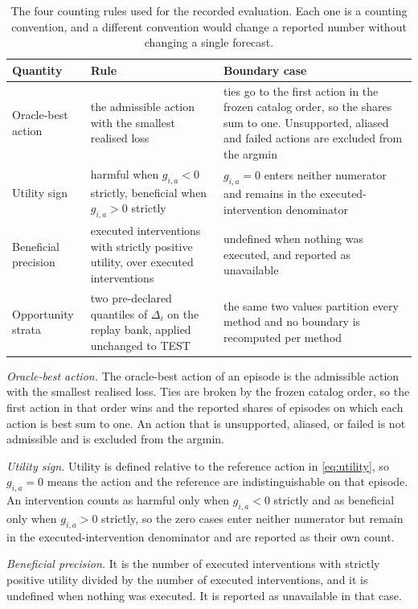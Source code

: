 \documentclass{article}
\begin{document}
\begin{table}[!t]
  \caption{The four counting rules used for the recorded evaluation. Each one is a
  counting convention, and a different convention would change a reported number
  without changing a single forecast.}
  \label{tab:app-counting}
  \centering
  \small
  \setlength{\tabcolsep}{4pt}
\begin{tabular}{@{}p{} p{} p{}@{}}
    \toprule
    Quantity & Rule & Boundary case \\
    \midrule
    Oracle-best action & the admissible action with the smallest realised loss & ties go to the first action in the frozen catalog order, so the shares sum to one. Unsupported, aliased and failed actions are excluded from the argmin \\
    Utility sign & harmful when $g_{i,a} < 0$ strictly, beneficial when $g_{i,a} > 0$ strictly & $g_{i,a} = 0$ enters neither numerator and remains in the executed-intervention denominator \\
    Beneficial precision & executed interventions with strictly positive utility, over executed interventions & undefined when nothing was executed, and reported as unavailable \\
    Opportunity strata & two pre-declared quantiles of $\Delta_i$ on the replay bank, applied unchanged to TEST & the same two values partition every method and no boundary is recomputed per method \\
    \bottomrule
  \end{tabular}
\end{table}

\emph{Oracle-best action.} The oracle-best action of an episode is the admissible action with
the smallest realised loss. Ties are broken by the frozen catalog order, so the first action in
that order wins and the reported shares of episodes on which each action is best sum to one. An
action that is unsupported, aliased, or failed is not admissible and is excluded from the
argmin.

\emph{Utility sign.} Utility is defined relative to the reference action in
\eqref{eq:utility}, so $g_{i,a} = 0$ means the action and the reference are indistinguishable on
that episode. An intervention counts as harmful only when $g_{i,a} < 0$ strictly and as
beneficial only when $g_{i,a} > 0$ strictly, so the zero cases enter neither numerator but remain in the executed-intervention denominator and are reported as their own count.

\emph{Beneficial precision.} It is the number of executed interventions with strictly positive
utility divided by the number of executed interventions, and it is undefined when nothing was
executed. It is reported as unavailable in that case.
\end{document}
